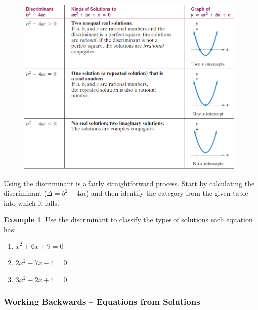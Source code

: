 \documentclass[addpoints,12pt]{exam}
\theoremstyle{definition}
\theoremstyle{break}
\theoremstyle{break}
\newtheorem{example}{Example}[subsection]
\begin{document}
\vspace{.2in}

\begin{figure}[h]
\centering
\includegraphics[scale=.7]{images/11_2_discriminant_table}
\end{figure}

\newpage

Using the discriminant is a fairly straightforward process. Start by calculating the discriminant ($\Delta = b^2-4ac$) and then identify the category from the given table into which it falls.

\vspace{.2in}

\begin{example}
Use the discriminant to classify the types of solutions each equation has:
\begin{enumerate}
\item $x^2+6x+9=0$
\vspace{1.75in}
\item $2x^2-7x-4=0$
\vspace{1.75in}
\item $3x^2-2x+4=0$
\vspace{1.75in}
\end{enumerate}
\end{example}

\newpage

\subsubsection*{Working Backwards -- Equations from Solutions}
\end{document}
